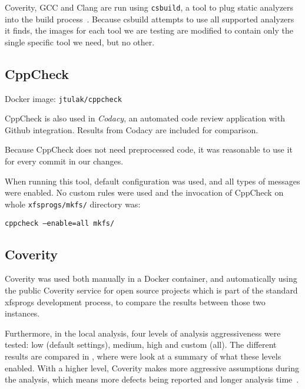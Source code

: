 Coverity, GCC and Clang are run using {\tt csbuild}, a tool to plug static
analyzers into the build process~\cite{csbuildMan}. Because csbuild attempts to
use all supported analyzers it finds, the images for each tool we are testing
are modified to contain only the single specific tool we need, but no other.
%
\subsection{CppCheck}
Docker image: {\tt jtulak/cppcheck}~\cite{dockerCPPCheck}

CppCheck is also used in {\em Codacy}, an automated code review application
with Github integration. Results from Codacy are included for comparison.

Because CppCheck does not need preprocessed code, it was reasonable to use
it for every commit in our changes.

When running this tool, default configuration was used, and all types of
messages were enabled. No custom rules were used and the invocation of
CppCheck on whole {\tt xfsprogs/mkfs/} directory was:

{\tt cppcheck --enable=all mkfs/}


\subsection{Coverity}
Coverity was used both manually in a Docker container, and automatically
using the public Coverity service for open source projects which is part
of the standard xfsprogs development process, to compare the results between
those two instances.

Furthermore, in the local analysis, four levels of analysis aggressiveness were
tested: low (default settings), medium, high and custom (all). The different
results are compared in , where were look at a
summary of what these levels enabled. With a higher level, Coverity makes more
aggressive assumptions during the analysis, which means more defects being
reported and longer analysis time~\cite{coverityMan}.

